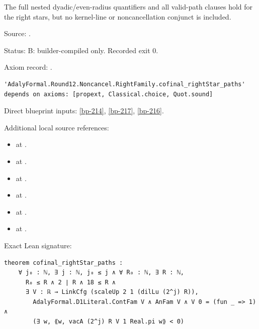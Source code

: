\begin{theorem}[bp-218]
\label{bp-218}
\leanok
The full nested dyadic/even-radius quantifiers and all valid-path clauses hold for the right stars, but no kernel-line or noncancellation conjunct is included.

\par Source: \texttt{}.
\par Status: B: builder-compiled only. Recorded exit 0.
\par Axiom record: \texttt{}.
\begin{verbatim}
'AdalyFormal.Round12.Noncancel.RightFamily.cofinal_rightStar_paths' depends on axioms: [propext, Classical.choice, Quot.sound]
\end{verbatim}
\par Direct blueprint inputs: \ref{bp-214}, \ref{bp-217}, \ref{bp-216}.
\par Additional local source references:
\begin{itemize}
\item \texttt{} at \texttt{}.
\item \texttt{} at \texttt{}.
\item \texttt{} at \texttt{}.
\item \texttt{} at \texttt{}.
\item \texttt{} at \texttt{}.
\item \texttt{} at \texttt{}.
\end{itemize}
\par Exact Lean signature:
\begin{verbatim}
theorem cofinal_rightStar_paths :
    ∀ j₀ : ℕ, ∃ j : ℕ, j₀ ≤ j ∧ ∀ R₀ : ℕ, ∃ R : ℕ,
      R₀ ≤ R ∧ 2 ∣ R ∧ 18 ≤ R ∧
      ∃ V : ℝ → LinkCfg (scaleUp 2 1 (dilLu (2^j) R)),
        AdalyFormal.D1Literal.ContFam V ∧ AnFam V ∧ V 0 = (fun _ => 1) ∧
        (∃ w, ⟪w, vacA (2^j) R V 1 Real.pi w⟫ < 0)
\end{verbatim}
\end{theorem}

